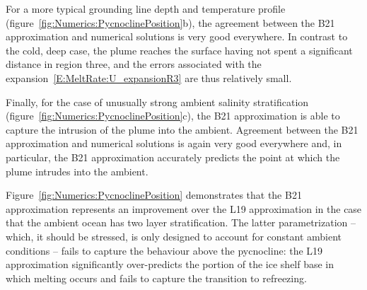 \documentclass[openacc]{rsproca_new}%
\begin{document}
For a more typical grounding line depth and temperature profile (figure~\ref{fig:Numerics:PycnoclinePosition}b), the agreement between the B21 approximation and numerical solutions is very good everywhere. In contrast to the cold, deep case, the plume reaches the surface having not spent a significant distance in region three, and the errors associated with the expansion~\eqref{E:MeltRate:U_expansionR3} are thus relatively small.

Finally, for the case of unusually strong ambient salinity stratification (figure~\ref{fig:Numerics:PycnoclinePosition}c), the B21 approximation is able to capture the intrusion of the  plume into the ambient. Agreement between the B21 approximation and numerical solutions is again very good everywhere and, in particular, the B21 approximation accurately predicts the point at which the plume intrudes into the ambient.

Figure~\ref{fig:Numerics:PycnoclinePosition} demonstrates that the B21 approximation represents an improvement over the L19 approximation in the case that the ambient ocean has two layer stratification. The latter parametrization -- which, it should be stressed, is only designed to account for constant ambient conditions -- fails to capture the behaviour above the pycnocline: the L19 approximation significantly over-predicts the portion of the ice shelf base in which melting occurs and fails to capture the transition to refreezing.
\end{document}
